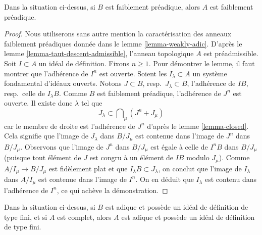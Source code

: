 \begin{lemma}
\label{lemma-taut-descent-weakly-adic}
Dans la situation ci-dessus, si $B$ est faiblement préadique, alors $A$
est faiblement préadique.
\end{lemma}

\begin{proof}
Nous utiliserons sans autre mention la caractérisation des anneaux faiblement préadiques donnée dans
le lemme \ref{lemma-weakly-adic}.
D'après le lemme \ref{lemma-taut-descent-admissible},
l'anneau topologique $A$ est préadmissible.
Soit $I \subset A$ un idéal de définition.
Fixons $n \geq 1$. Pour démontrer le lemme, il faut
montrer que l'adhérence de $I^n$ est ouverte.
Soient les $I_\lambda \subset A$ un système fondamental d'idéaux ouverts.
Notons $J \subset B$, resp.\ $J_\lambda \subset B$,
l'adhérence de $IB$, resp.\ celle de $I_\lambda B$.
Comme $B$ est faiblement préadique, l'adhérence de $J^n$ est ouverte.
Il existe donc $\lambda$ tel que
$$
J_\lambda \subset \bigcap\nolimits_\mu (J^n + J_\mu)
$$
car le membre de droite est l'adhérence de $J^n$ d'après
le lemme \ref{lemma-closed}.
Cela signifie que l'image de $J_\lambda$ dans $B/J_\mu$ est contenue dans
l'image de $J^n$ dans $B/J_\mu$. Observons que l'image de $J^n$ dans
$B/J_\mu$ est égale à celle de $I^nB$ dans $B/J_\mu$ (puisque tout élément
de $J$ est congru à un élément de $IB$ modulo $J_\mu$).
Comme $A/I_\mu \to B/J_\mu$ est fidèlement plat et que
$I_\lambda B \subset J_\lambda$,
on conclut que l'image de $I_\lambda$ dans $A/I_\mu$
est contenue dans l'image de $I^n$.
On en déduit que $I_\lambda$ est contenu dans l'adhérence
de $I^n$, ce qui achève la démonstration.
\end{proof}

\begin{lemma}
\label{lemma-taut-descent-adic-star}
Dans la situation ci-dessus, si $B$ est adique et possède un idéal de définition
de type fini, et si $A$ est complet, alors $A$ est adique et
possède un idéal de définition de type fini.
\end{lemma}

